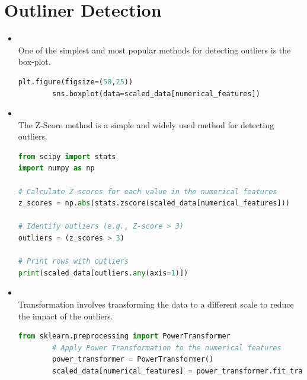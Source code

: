 \documentclass{article}
\begin{document}
\section{Outliner Detection}
\begin{itemize}
    \item \textbf{\textcolor{blue}{}}\\
    One of the simplest and most popular methods for detecting outliers is the box-plot.
    \begin{center}
    \begin{lstlisting}[language=Python, caption={Logistic Regression Example}, label={lst:logreg}, backgroundcolor=\color{gray!10}, frame=single, keywordstyle=\color{blue}\bfseries, commentstyle=\color{green!50!black}, stringstyle=\color{orange}]
        plt.figure(figsize=(50,25))
        sns.boxplot(data=scaled_data[numerical_features])
    \end{lstlisting}
    \end{center}
    \newpage

    \item \textbf{\textcolor{blue}{}}\\
    The Z-Score method is a simple and widely used method for detecting outliers.
    \begin{center}
        \begin{lstlisting}[language=Python, caption={Logistic Regression Example}, label={lst:logreg}, backgroundcolor=\color{gray!10}, frame=single, keywordstyle=\color{blue}\bfseries, commentstyle=\color{green!50!black}, stringstyle=\color{orange}]
from scipy import stats
import numpy as np

# Calculate Z-scores for each value in the numerical features
z_scores = np.abs(stats.zscore(scaled_data[numerical_features]))

# Identify outliers (e.g., Z-score > 3)
outliers = (z_scores > 3)

# Print rows with outliers
print(scaled_data[outliers.any(axis=1)])
\end{lstlisting}
\end{center}
 \item \textbf{\textcolor{blue}{}}\\
 Transformation involves transforming the data to a different scale to reduce the impact of the outliers.   
 \begin{center}
    \begin{lstlisting}[language=Python, caption={Logistic Regression Example}, label={lst:logreg}, backgroundcolor=\color{gray!10}, frame=single, keywordstyle=\color{blue}\bfseries, commentstyle=\color{green!50!black}, stringstyle=\color{orange}]
        from sklearn.preprocessing import PowerTransformer
        # Apply Power Transformation to the numerical features  
        power_transformer = PowerTransformer()
        scaled_data[numerical_features] = power_transformer.fit_transform(scaled_data[numerical_features])    
    \end{lstlisting}    
    \end{center}
\end{itemize}
\newpage
\end{document}
